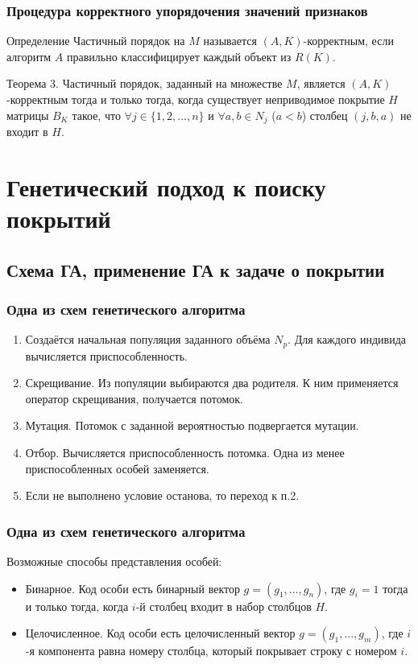 \documentclass[
	11pt,
]{beamer}
\begin{document}
\begin{frame}
	\frametitle{Процедура корректного упорядочения значений признаков}

	\begin{block}{Определение}
		Частичный порядок на $M$ называется $(A, K)$-корректным, если алгоритм $A$ правильно классифицирует каждый объект из $R(K)$.
	\end{block}

	\begin{block}{Теорема 3.}
		Частичный порядок, заданный на множестве $M$, является $(A, K)$-корректным тогда и только тогда, когда существует неприводимое покрытие $H$ матрицы $B_K$ такое, что $\forall j \in \{1, 2, ..., n\}$ и $\forall a, b \in N_j$ ($a < b$) столбец $(j, b, a)$ не входит в $H$.
	\end{block}
\end{frame}

\section{Генетический подход к поиску покрытий}

\subsection{Схема ГА, применение ГА к задаче о покрытии}

\begin{frame}
	\frametitle{Одна из схем генетического алгоритма}

	\begin{enumerate}
		\item Создаётся начальная популяция заданного объёма $N_p$. Для каждого индивида вычисляется приспособленность.
		\item Скрещивание. Из популяции выбираются два родителя. К ним применяется оператор скрещивания, получается потомок.
		\item Мутация. Потомок с заданной вероятностью подвергается мутации.
		\item Отбор. Вычисляется приспособленность потомка. Одна из менее приспособленных особей заменяется.
		\item Если не выполнено условие останова, то переход к п.2.
	\end{enumerate}
\end{frame}

\begin{frame}
	\frametitle{Одна из схем генетического алгоритма}

	Возможные способы представления особей:
	\begin{itemize}
		\item Бинарное. Код особи есть бинарный вектор $g = (g_1, ..., g_n)$, где $g_i = 1$ тогда и только тогда, когда $i$-й столбец входит в набор столбцов $H$.
		\item Целочисленное. Код особи есть целочисленный вектор $g = (g_1, ..., g_m)$, где $i$-я компонента равна номеру столбца, который покрывает строку с номером $i$.
	\end{itemize}
\end{frame}
\end{document}
